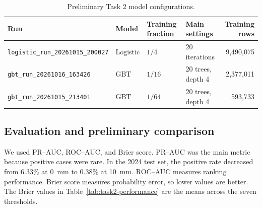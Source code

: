 \documentclass[11pt]{article}
\begin{document}
\begin{table}[htbp]
    \centering
    \caption{Preliminary Task 2 model configurations.}
    \label{tab:task2-runs}
    \small
    \begin{tabular}{@{}llllr@{}}
        \toprule
        Run & Model & Training fraction & Main settings & Training rows \\
        \midrule
        \texttt{logistic\_run\_20261015\_200027}
            & Logistic & $1/4$ & 20 iterations & 9,490,075 \\
        \texttt{gbt\_run\_20261016\_163426}
            & GBT & $1/16$ & 20 trees, depth 4 & 2,377,011 \\
        \texttt{gbt\_run\_20261015\_213401}
            & GBT & $1/64$ & 20 trees, depth 4 & 593,733 \\
        \bottomrule
    \end{tabular}
\end{table}

\subsection{Evaluation and preliminary comparison}

We used PR--AUC, ROC--AUC, and Brier score. PR--AUC was the main metric because
positive cases were rare. In the 2024 test set, the positive rate decreased
from 6.33\% at 0~mm to 0.38\% at 10~mm. ROC--AUC measures ranking performance.
Brier score measures probability error, so lower values are better. The Brier
values in Table~\ref{tab:task2-performance} are the means across the seven
thresholds.

\begin{table}[htbp]
    \centering
    \caption{Overall discrimination and mean threshold-specific probability
    error for the three preliminary models.}
    \label{tab:task2-performance}
    \small
\end{table}
\end{document}
